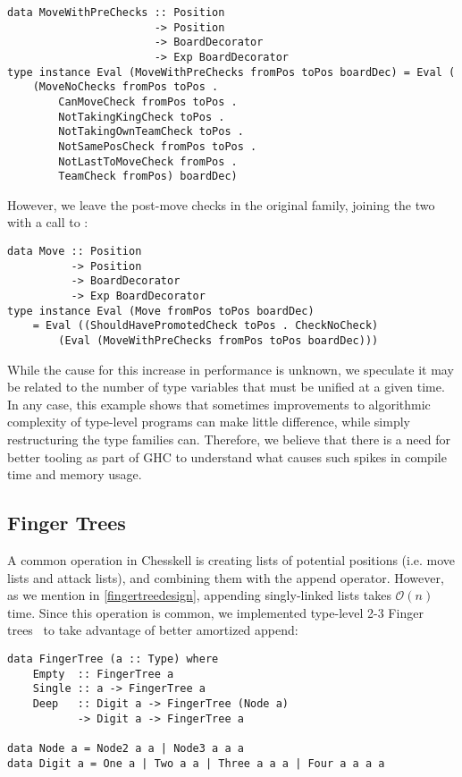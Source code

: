 \newpage  %

\begin{lstlisting}
data MoveWithPreChecks :: Position
                       -> Position
                       -> BoardDecorator
                       -> Exp BoardDecorator
type instance Eval (MoveWithPreChecks fromPos toPos boardDec) = Eval (
    (MoveNoChecks fromPos toPos .
        CanMoveCheck fromPos toPos .
        NotTakingKingCheck toPos .
        NotTakingOwnTeamCheck toPos .
        NotSamePosCheck fromPos toPos .
        NotLastToMoveCheck fromPos .
        TeamCheck fromPos) boardDec)
\end{lstlisting}

However, we leave the post-move checks in the original  family, joining the two with a call to :

\begin{lstlisting}
data Move :: Position
          -> Position
          -> BoardDecorator
          -> Exp BoardDecorator
type instance Eval (Move fromPos toPos boardDec)
    = Eval ((ShouldHavePromotedCheck toPos . CheckNoCheck)
        (Eval (MoveWithPreChecks fromPos toPos boardDec)))
\end{lstlisting}

While the cause for this increase in performance is unknown, we speculate it may be related to the number of type variables that must be unified at a given time. In any case, this example shows that sometimes improvements to algorithmic complexity of type-level programs can make little difference, while simply restructuring the type families can. Therefore, we believe that there is a need for better tooling as part of GHC to understand what causes such spikes in compile time and memory usage.

\subsection{Finger Trees} \label{fingertreesection}

A common operation in Chesskell is creating lists of potential positions (i.e. move lists and attack lists), and combining them with the append \inline{(++)} operator. However, as we mention in \cref{fingertreedesign}, appending singly-linked lists takes $\mathcal{O}(n)$ time. Since this operation is common, we implemented type-level 2-3 Finger trees~\cite{fingertrees} to take advantage of better amortized append:

\begin{lstlisting}
data FingerTree (a :: Type) where
    Empty  :: FingerTree a
    Single :: a -> FingerTree a
    Deep   :: Digit a -> FingerTree (Node a) 
           -> Digit a -> FingerTree a

data Node a = Node2 a a | Node3 a a a
data Digit a = One a | Two a a | Three a a a | Four a a a a
\end{lstlisting}

